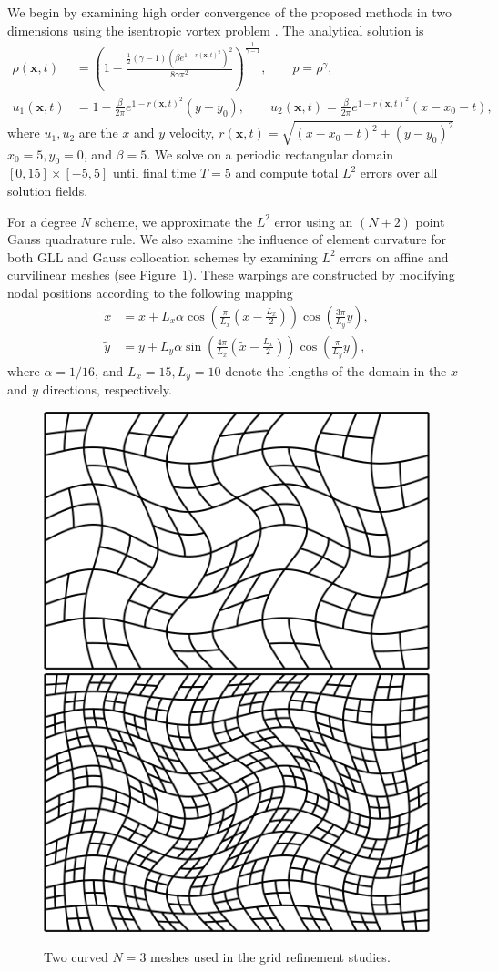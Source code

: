 \documentclass{svjour3}                     %
\renewcommand{\tilde}{\widetilde}
\newcommand{\LRp}[1]{\left( #1 \right)}
\begin{document}
We begin by examining high order convergence of the proposed methods in two dimensions using the isentropic vortex problem \cite{shu1998essentially, crean2017high}.  The analytical solution is 
\begin{align}
\rho(\bm{x},t) &= \LRp{1 - \frac{\frac{1}{2}(\gamma-1)(\beta e^{1-r(\bm{x},t)^2})^2}{8\gamma \pi^2}}^{\frac{1}{\gamma-1}}, \qquad p = \rho^{\gamma},\\
u_1(\bm{x},t) &= 1 - \frac{\beta}{2\pi} e^{1-r(\bm{x},t)^2}(y-y_0), \qquad u_2(\bm{x},t) = \frac{\beta}{2\pi} e^{1-r(\bm{x},t)^2}(x-x_0-t),\nonumber
\end{align}
where $u_1, u_2$ are the $x$ and $y$ velocity, $r(\bm{x},t) = \sqrt{(x-x_0-t)^2 + (y-y_0)^2}$$x_0 = 5, y_0 = 0$, and $\beta = 5$.   We solve on a periodic rectangular domain $[0, 15] \times [-5,5]$ until final time $T=5$ and compute total $L^2$ errors over all solution fields.  

For a degree $N$ scheme, we approximate the $L^2$ error using an $(N+2)$ point Gauss quadrature rule.  We also examine the influence of element curvature for both GLL and Gauss collocation schemes by examining $L^2$ errors on affine and curvilinear meshes (see Figure~\ref{fig:mesh2d}).  These warpings are constructed by modifying nodal positions according to the following mapping
\begin{align*}
\tilde{x} &= x + L_x\alpha\cos\LRp{\frac{\pi}{L_x}\LRp{x-\frac{L_x}{2}}}\cos\LRp{\frac{3\pi}{L_y}y}, \\
\tilde{y} &= y + L_y\alpha\sin\LRp{\frac{4\pi}{L_x}\LRp{\tilde{x}-\frac{L_x}{2}}}\cos\LRp{\frac{\pi}{L_y}y},
\end{align*}
where $\alpha = 1/16$, and $L_x = 15, L_y = 10$ denote the lengths of the domain in the $x$ and $y$ directions, respectively.  

\begin{figure}
\centering
\includegraphics[width=.45\textwidth]{figs/noncon_curved_mesh.png}
\hspace{.5em}
\includegraphics[width=.45\textwidth]{figs/noncon_curved_mesh2.png}
\caption{Two curved $N=3$ meshes used in the grid refinement studies.}
\label{fig:mesh2d}
\end{figure}
\end{document}
